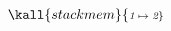 \newcommand{\bytecell}[2]{\scriptstyle\textit{#1} \;\mapsto\; \textit{#2}}
$
    \begin{array}{@{}c@{}}
    \kall{stackmem}{
      \bytecell{1}{2}
      
    } \mathrel{}
    \end{array}
$
